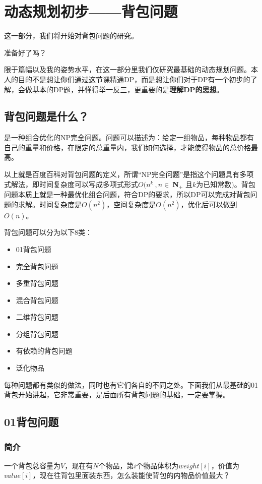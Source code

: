 \section{动态规划初步------背包问题}
这一部分，我们将开始对背包问题的研究。

准备好了吗？

限于篇幅以及我的姿势水平，在这一部分里我们仅研究最基础的动态规划问题。本人的目的不是想让你们通过这节课精通DP，而是想让你们对于DP有一个初步的了解，会做基本的DP题，并懂得举一反三，更重要的是\textbf{理解DP的思想}。
\subsection{背包问题是什么？}
\begin{definition}是一种组合优化的NP完全问题。问题可以描述为：给定一组物品，每种物品都有自己的重量和价格，在限定的总重量内，我们如何选择，才能使得物品的总价格最高。
\end{definition}

以上就是百度百科对背包问题的定义，所谓“NP完全问题”是指这个问题具有多项式解法，即时间复杂度可以写成多项式形式$O(n^k\ , n \in\ $\textbf{N}$_+$
且$k$为已知常数$)$。背包问题本质上就是一种最优化组合问题，符合DP的要求，所以DP可以完成对背包问题的求解。时间复杂度是$O(n^2)$，空间复杂度是$O(n^2)$，优化后可以做到$O(n)$。

背包问题可以分为以下8类：
\begin{itemize}
	\item{01背包问题}
	\item{完全背包问题}
	\item{多重背包问题}
	\item{混合背包问题}
	\item{二维背包问题}
	\item{分组背包问题}
	\item{有依赖的背包问题}
	\item{泛化物品}
\end{itemize}

每种问题都有类似的做法，同时也有它们各自的不同之处。下面我们从最基础的01背包开始讲起，它非常重要，是后面所有背包问题的基础，一定要掌握。

\subsection{01背包问题}
\subsubsection{简介}
\begin{definition}[01背包问题]一个背包总容量为$V$，现在有$N$个物品，第$i$个物品体积为$weight[i]$，价值为$value[i]$，现在往背包里面装东西，怎么装能使背包的内物品价值最大？\end{definition}

